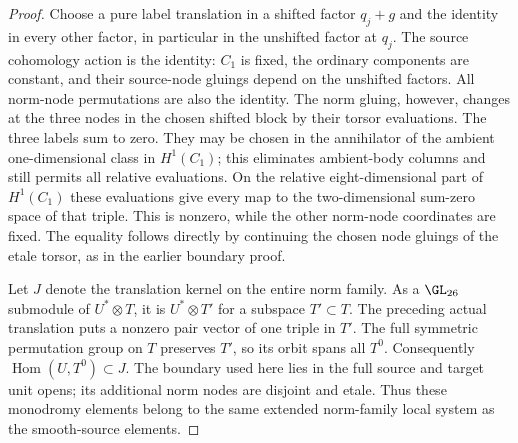 \begin{proof}
Choose a pure label translation in a shifted factor
$q_j+g$ and the identity in every other factor, in particular
in the unshifted factor at $q_j$. The source cohomology action
is the identity: $C_1$ is fixed, the ordinary components are
constant, and their source-node gluings depend on the unshifted
factors. All norm-node permutations are also the identity.
The norm gluing, however, changes at the three nodes in the
chosen shifted block by their torsor evaluations. The three
labels sum to zero. They may be chosen in the annihilator of
the ambient one-dimensional class in $H^1(C_1)$; this eliminates
ambient-body columns and still permits all relative evaluations.
On the relative eight-dimensional part
of $H^1(C_1)$ these evaluations give every map to the
two-dimensional sum-zero space of that triple. This is
nonzero, while the other norm-node coordinates are fixed.
The equality follows directly by continuing the chosen node
gluings of the etale torsor, as in the earlier boundary proof.

Let $J$ denote the translation kernel on the entire norm
family. As a $\GL_{26}$ submodule of $U^*\otimes T$, it is
$U^*\otimes T'$ for a subspace $T'\subset T$.
The preceding actual translation puts a nonzero pair vector
of one triple in $T'$. The full symmetric permutation group
on $T$ preserves $T'$, so its orbit spans all $T^0$.
Consequently $\operatorname{Hom}(U,T^0)\subset J$.
The boundary used here lies in the full source and target
unit opens; its additional norm nodes are disjoint and etale.
Thus these monodromy elements belong to the same extended
norm-family local system as the smooth-source elements.
\end{proof}

